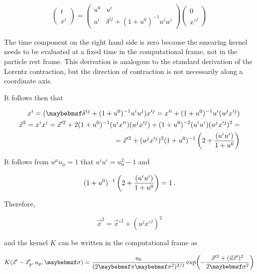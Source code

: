 \begin{align}
  \left( \begin{array}{c}  t \\ x^i \end{array} \right)
  = \left( \begin{array}{cc}
           u^0  &  u^i  \\
           u^i  &  \delta^{ij} + (1+u^0)^{-1} u^i u^j
    \end{array} \right)
  \left( \begin{array}{c}  0 \\ x'^j \end{array} \right)
\end{align}

The time component on the right hand side is zero because the smearing kernel
needs to be evaluated at a fixed time in the computational frame,
not in the particle rest frame. This derivation is analogous to the
standard derivation of the Lorentz contraction, but the direction of contraction
is not necessarily along a coordinate axis.

It follows then that

\begin{align}
  x^i = (\delta^{ij} + (1+u^0)^{-1} u^i u^j) x'^j = x'^i + (1+u^0)^{-1} u^i (u^j x'^j) \\
  \vec{x}^2 = x^i x^i = \vec{x}'^2 + 2 (1+u^0)^{-1} (u^i x'^i) (u^j x'^j) + (1+u^0)^{-2} (u^i u^i) (u^j x'^j)^2 = \\
  = \vec{x}'^2 + (u^j x'^j)^2 (1+u^0)^{-1} \parenths{2 + \frac{(u^i u^i)}{1+u^0}}
\end{align}

It follows from  $u^{\mu} u_{\mu} = 1$ that $u^i u^i = u_0^2 - 1$ and

\begin{equation}
  (1+u^0)^{-1} \left({2 + \frac{(u^i u^i)}{1+u^0}}\right) = 1 \,.
\end{equation}

Therefore,

\begin{equation}
  \vec{x}^2 = \vec{x}'^2 + (u^j x'^j)^2
\end{equation}

and the kernel $K$ can be written in the computational frame as

\begin{equation} \label{eq:smearing_kernel}
  K(\vec{x}' - \vec{x}'_p, u_p, \sigma) = \frac{u_0}{(2\pi \sigma^2)^{3/2}}
  \expOf{-\frac{\vec{x}'^2 + (\vec{u} \vec{x}')^2}{2\sigma^2}}
\end{equation}

